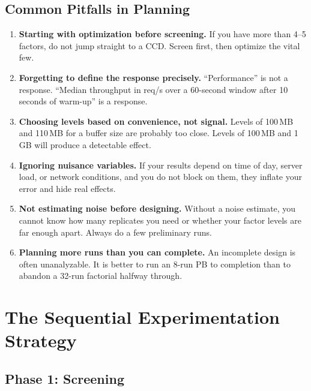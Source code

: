 \documentclass[11pt]{book}
\begin{document}
\section{Common Pitfalls in Planning}

\begin{enumerate}
\item \textbf{Starting with optimization before screening.} If you have more
      than 4--5 factors, do not jump straight to a CCD. Screen first, then
      optimize the vital few.

\item \textbf{Forgetting to define the response precisely.} ``Performance''
      is not a response. ``Median throughput in req/s over a 60-second window
      after 10 seconds of warm-up'' is a response.

\item \textbf{Choosing levels based on convenience, not signal.} Levels of
      100\,MB and 110\,MB for a buffer size are probably too close. Levels of
      100\,MB and 1\,GB will produce a detectable effect.

\item \textbf{Ignoring nuisance variables.} If your results depend on time of
      day, server load, or network conditions, and you do not block on them,
      they inflate your error and hide real effects.

\item \textbf{Not estimating noise before designing.} Without a noise estimate,
      you cannot know how many replicates you need or whether your factor levels
      are far enough apart. Always do a few preliminary runs.

\item \textbf{Planning more runs than you can complete.} An incomplete design is
      often unanalyzable. It is better to run an 8-run PB to completion than to
      abandon a 32-run factorial halfway through.
\end{enumerate}


\chapter{The Sequential Experimentation Strategy}

\section{Phase 1: Screening}
\end{document}
